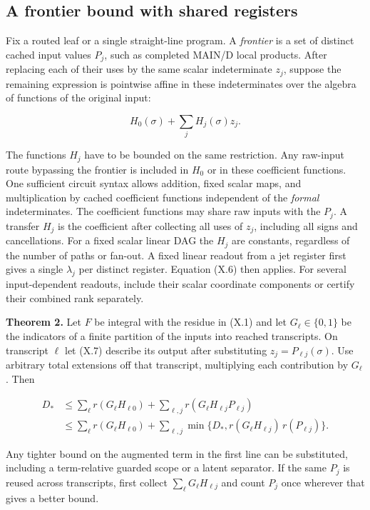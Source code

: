 \documentclass[
  11pt,
]{article}
\begin{document}
\subsection{A frontier bound with shared
registers}\label{a-frontier-bound-with-shared-registers}

Fix a routed leaf or a single straight-line program. A \emph{frontier}
is a set of distinct cached input values \(P_j\), such as completed
MAIN/D local products. After replacing each of their uses by the same
scalar indeterminate \(z_j\), suppose the remaining expression is
pointwise affine in these indeterminates over the algebra of functions
of the original input:

\[
       H_0(\sigma)+\sum_{j}H_j(\sigma)z_j .                  \tag{X.7}
\]

The functions \(H_j\) have to be bounded on the same restriction. Any
raw-input route bypassing the frontier is included in \(H_0\) or in
these coefficient functions. One sufficient circuit syntax allows
addition, fixed scalar maps, and multiplication by cached coefficient
functions independent of the \emph{formal} indeterminates. The
coefficient functions may share raw inputs with the \(P_j\). A transfer
\(H_j\) is the coefficient after collecting all uses of \(z_j\),
including all signs and cancellations. For a fixed scalar linear DAG the
\(H_j\) are constants, regardless of the number of paths or fan-out. A
fixed linear readout from a jet register first gives a single
\(\lambda_j\) per distinct register. Equation (X.6) then applies. For
several input-dependent readouts, include their scalar coordinate
components or certify their combined rank separately.

\textbf{Theorem 2.} Let \(F\) be integral with the residue in (X.1) and
let \(G_\ell\in\{0,1\}\) be the indicators of a finite partition of the
inputs into reached transcripts. On transcript \(\ell\) let (X.7)
describe its output after substituting \(z_j=P_{\ell j}(\sigma)\). Use
arbitrary total extensions off that transcript, multiplying each
contribution by \(G_\ell\). Then

\[
\begin{split}
 D_*&\le\sum_\ell r(G_\ell H_{\ell0})
       +\sum_{\ell,j} r(G_\ell H_{\ell j} P_{\ell j})\\
 &\le\sum_\ell r(G_\ell H_{\ell0})
       +\sum_{\ell,j}\min\{D_*,
                   r(G_\ell H_{\ell j})\,r(P_{\ell j})\}.
\end{split}
\tag{X.8}
\]

Any tighter bound on the augmented term in the first line can be
substituted, including a term-relative guarded scope or a latent
separator. If the same \(P_j\) is reused across transcripts, first
collect \(\sum_\ell G_\ell H_{\ell j}\) and count \(P_j\) once wherever
that gives a better bound.
\end{document}
